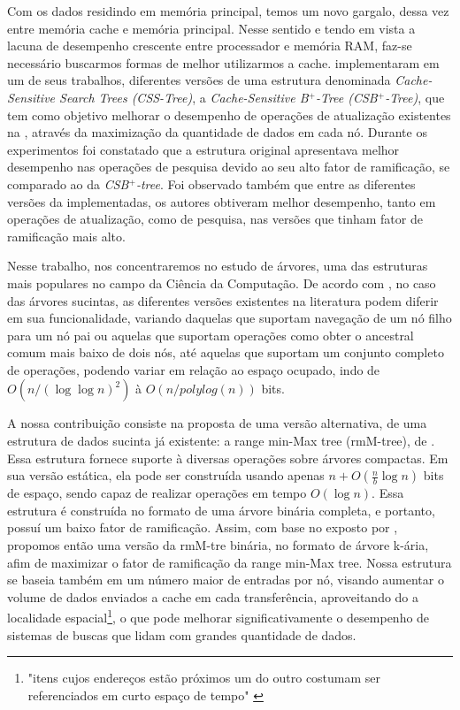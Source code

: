 Com os dados residindo em memória principal, temos um novo gargalo, dessa vez entre memória cache e memória principal. Nesse sentido e tendo em vista a lacuna de desempenho crescente entre processador e memória RAM, faz-se necessário buscarmos formas de melhor utilizarmos a cache.  \citet{paper-making-btree-cache} implementaram em um de seus trabalhos, diferentes versões de uma estrutura denominada \textit{Cache-Sensitive Search Trees (CSS-Tree)}, a \textit{Cache-Sensitive B$^+$-Tree (CSB$^+$-Tree)}, que tem como objetivo melhorar o desempenho de operações de atualização existentes na , através da maximização da quantidade de dados em cada nó. Durante os experimentos foi constatado que a estrutura original apresentava melhor desempenho nas operações de pesquisa devido ao seu alto fator de ramificação, se comparado ao da \textit{CSB$^+$-tree}. Foi observado também que entre as diferentes versões da  implementadas, os autores obtiveram melhor desempenho, tanto em operações de atualização, como de pesquisa, nas versões que tinham fator de ramificação mais alto.

Nesse trabalho, nos concentraremos no estudo de árvores, uma das estruturas mais populares no campo da Ciência da Computação. De acordo com \citet{paper-succint-trees-in-practice}, no caso das árvores sucintas, as diferentes versões existentes na literatura podem diferir em sua funcionalidade, variando daquelas que suportam navegação de um nó filho para um nó pai ou aquelas que suportam operações como obter o ancestral comum mais baixo de dois nós, até aquelas que suportam um conjunto completo de operações, podendo variar em relação ao espaço ocupado, indo  de $O(n/(\log \log n)^2)$ à $O(n/ polylog(n))$ bits.

A nossa contribuição consiste na proposta de uma versão alternativa, de uma estrutura de dados sucinta já existente: a range min-Max tree (rmM-tree), de \cite{paper-fully-functinal-succint-trees}. Essa estrutura fornece suporte à diversas operações sobre árvores compactas. Em sua versão estática, ela pode ser construída usando apenas $n + O(\frac{n}{b} \log n)$ bits de espaço, sendo capaz de realizar operações em tempo $O(\log n)$\citep{paper-fully-functinal-succint-trees}. Essa estrutura é construída no formato de uma árvore binária completa, e portanto, possuí um baixo fator de ramificação. Assim, com base no exposto por \citet{paper-making-btree-cache}, propomos então uma versão da rmM-tre binária, no formato de árvore k-ária, afim de maximizar o fator de ramificação da range min-Max tree. Nossa estrutura se baseia também em um número maior de entradas por nó, visando aumentar o volume de dados enviados a cache em cada transferência, aproveitando do a localidade espacial\footnote{"itens cujos endereços estão próximos um do outro costumam ser referenciados em curto espaço de tempo" \citep{book-computer-architecutre}}, o que pode melhorar significativamente o desempenho de sistemas de buscas que lidam com grandes quantidade de dados.



